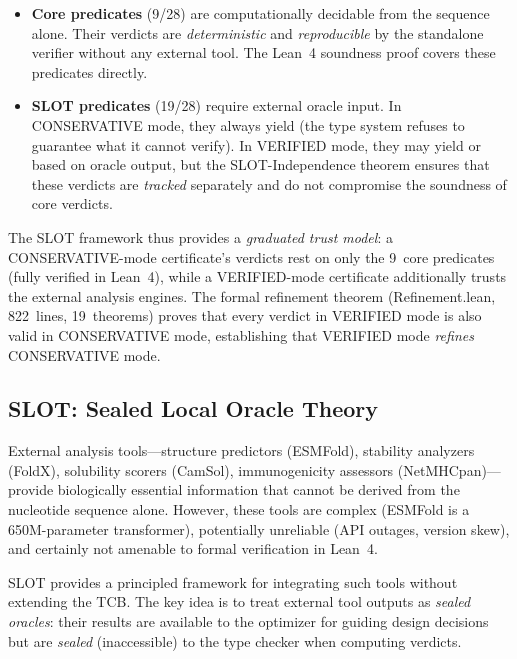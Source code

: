 \begin{itemize}[leftmargin=*,itemsep=0pt,topsep=1pt]
\item \textbf{Core predicates} (9/28) are computationally decidable
      from the sequence alone.
      Their verdicts are \emph{deterministic} and \emph{reproducible}
      by the standalone verifier without any external tool.
      The Lean~4 soundness proof covers these predicates directly.

\item \textbf{SLOT predicates} (19/28) require external oracle input.
      In CONSERVATIVE mode, they always yield \UNCERTAIN{} (the type
      system refuses to guarantee what it cannot verify).
      In VERIFIED mode, they may yield \PASS{} or \FAIL{} based on
      oracle output, but the SLOT-Independence theorem ensures that
      these verdicts are \emph{tracked} separately and do not
      compromise the soundness of core verdicts.
\end{itemize}

\noindent The SLOT framework thus provides a \emph{graduated trust
model}: a CONSERVATIVE-mode certificate's \PASS{} verdicts rest on
only the 9~core predicates (fully verified in Lean~4), while a
VERIFIED-mode certificate additionally trusts the external analysis
engines.
The formal refinement theorem (Refinement.lean, 822~lines,
19~theorems) proves that every \PASS{} verdict in VERIFIED mode is
also valid in CONSERVATIVE mode, establishing that VERIFIED mode
\emph{refines} CONSERVATIVE mode.

\subsection{SLOT: Sealed Local Oracle Theory}\label{sec:slot}

External analysis tools---structure predictors (ESMFold), stability
analyzers (FoldX), solubility scorers (CamSol), immunogenicity
assessors (NetMHCpan)---provide biologically essential information
that cannot be derived from the nucleotide sequence alone.
However, these tools are complex (ESMFold is a 650M-parameter
transformer), potentially unreliable (API outages, version skew), and
certainly not amenable to formal verification in Lean~4.

SLOT provides a principled framework for integrating such tools
without extending the TCB.
The key idea is to treat external tool outputs as \emph{sealed
oracles}: their results are available to the optimizer for guiding
design decisions but are \emph{sealed} (inaccessible) to the type
checker when computing verdicts.


